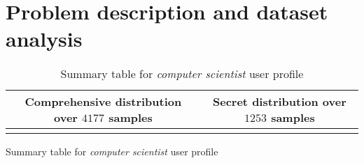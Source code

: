 \documentclass[10pt,a4paper]{article}
\begin{document}
\title{\rmfamily\normalfont{}} 
    \author{\\} \date{\today}
    
    \maketitle

    \begin{abstract}
      This article collects the work I did in order to support my
      Quantitative Systems Analysis exam. The goal is to study
      resources usage respect a collection of user profiles, each one
      of them producing different network traffic and CPU/memory
      consumption patterns in different time windows. I performed some
      experiments repeating them over time, analyzing results with a
      piece of Smalltalk software, initially implemented for the
      problem at hand, but it turns out to be far more general.
    \end{abstract}
       
    \tableofcontents
   
 
    \newpage

    \section{Problem description and dataset analysis}

    \begin{table}
        \begin{tabular}{ c | c }
            Comprehensive distribution over $4177$ samples  &   Secret distribution over $1253$ samples \\
            \hline 
             &  \\
            \hline
        \end{tabular}
      \caption{Summary table for \emph{computer scientist} user profile}
      \label{fig:computer-scientist-user-profile}
    \end{table}

    \lipsum[1]

    \begin{table}
      \begin{adjustwidth}{-4cm}{}
            
      \end{adjustwidth}
      \caption{Summary table for \emph{computer scientist} user profile}
      \label{fig:computer-scientist-user-profile}
    \end{table}
\end{document}
